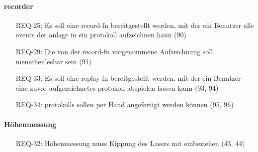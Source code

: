 \paragraph{\gls{recorder}}
\begin{itemize}
    \item[REQ-25:] Es soll eine \gls{record-fn} bereitgestellt werden, mit der ein Benutzer alle
    \glspl{event} der \gls{anlage} in ein \gls{protokoll} aufzeichnen kann (90)
    \item[REQ-29:] Die von der \gls{record-fn} vorgenommene Aufzeichnung soll menschenlesbar sein (91)
    \item[REQ-33:] Es soll eine \gls{replay-fn} bereitgestellt werden, mit der ein
    Benutzer eine zuvor aufgezeichnetes \gls{protokoll} abspielen lassen kann (93, 94)
    \item[REQ-34:] \glspl{protokoll} sollen per Hand angefertigt werden können (95, 96)
\end{itemize}

\paragraph{Höhenmessung}
\begin{itemize}
    \item[REQ-32:] Höhenmessung muss Kippung des Lasers mit einbeziehen (43, 44) %
\end{itemize}

